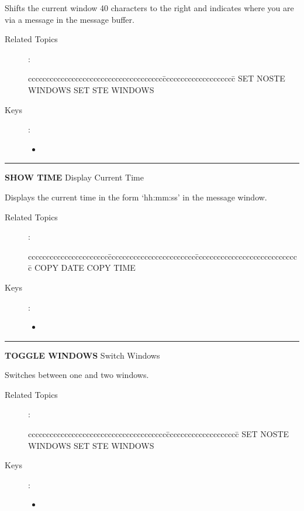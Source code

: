 \medskip
  Shifts the current window 40 characters to the right and indicates
  where you are via a message in the message buffer.

\begin{description}
\item[Related Topics]:
\begin{tabbing}
ccccccccccccccccccccccccccccccccccccc\=cccccccccccccccccccc\=\kill
    SET NOSTE WINDOWS \>   SET STE WINDOWS\\
\end{tabbing}

\item[Keys]:
     \begin{itemize}
     \item \gold\ \keyname{$\rhd$}
     \end{itemize}

\end{description}

\goodbreak

\rule{\textwidth}{0.3mm}

{\Large {\bf SHOW TIME} \hfill Display Current Time}

\medskip
  Displays the current time in the form `hh:mm:ss' in the message
  window.

\begin{description}
\item[Related Topics]:
\begin{tabbing}
cccccccccccccccccccccc\=cccccccccccccccccccccccc\=ccccccccccccccccccccccccccccc\=\kill
COPY DATE \> COPY TIME \\
\end{tabbing}

\item[Keys]:
    \begin{itemize}
    \item \gold\ 
    \end{itemize}
\end{description}

\goodbreak

\rule{\textwidth}{0.3mm}

{\Large {\bf TOGGLE WINDOWS} \hfill Switch Windows}

\medskip
  Switches between one and two windows.

\begin{description}
\item[Related Topics]:
\begin{tabbing}
cccccccccccccccccccccccccccccccccccccc\=cccccccccccccccccccc\=\kill
SET NOSTE WINDOWS \> SET STE WINDOWS\\
\end{tabbing}

\item[Keys]:
        \begin{itemize}
        \item \gold\ \keyname{=}
        \end{itemize}
\end{description}

